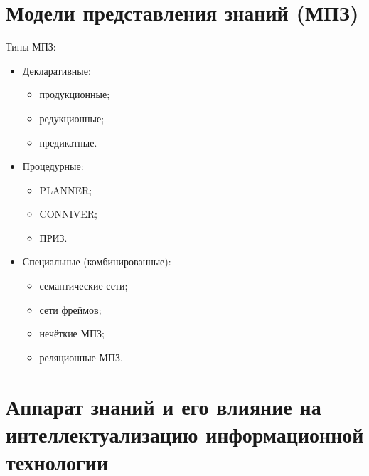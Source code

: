 
\section{Модели представления знаний (МПЗ)}

Типы МПЗ:
\begin{itemize}
\item Декларативные:
  \begin{itemize}
  \item продукционные;
  \item редукционные;
  \item предикатные.
  \end{itemize}
\item Процедурные:
  \begin{itemize}
  \item PLANNER;
  \item CONNIVER;
  \item ПРИЗ.
  \end{itemize}
\item Специальные (комбинированные):
  \begin{itemize}
  \item семантические сети;
  \item сети фреймов;
  \item нечёткие МПЗ;
  \item реляционные МПЗ.
  \end{itemize}
\end{itemize}


\section{Аппарат знаний и его влияние на интеллектуализацию
  информационной технологии}

